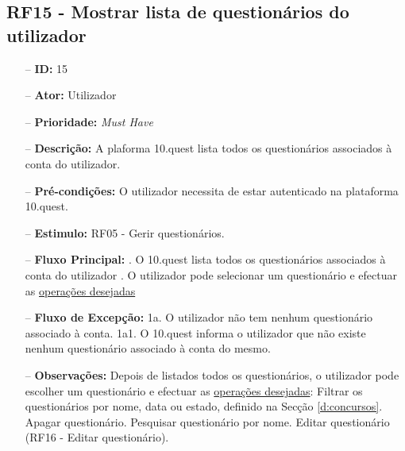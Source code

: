 \subsection{RF15 - Mostrar lista de questionários do utilizador}
\begin{itemize}
	\item[--] \textbf{ID:} 15
	\item[--]  \textbf{Ator:} Utilizador
	\item[--]  \textbf{Prioridade:} \textit{Must Have}
	\item[--]  \textbf{Descrição:} A plaforma 10.quest lista todos os questionários associados à conta do utilizador.
	\item[--]  \textbf{Pré-condições:} O utilizador necessita de estar autenticado na plataforma 10.quest.
	\item[--]  \textbf{Estimulo:} RF05 - Gerir questionários.
	\item[--]  \textbf{Fluxo Principal:} 
		. O 10.quest lista todos os questionários associados à conta do utilizador
		. O utilizador pode selecionar um questionário e efectuar as \underline{operações desejadas}
	\item[--]  \textbf{Fluxo de Excepção:} 
		\subitem 1a. O utilizador não tem nenhum questionário associado à conta.
		\subitem 1a1. O 10.quest informa o utilizador que não existe nenhum questionário associado à conta do mesmo.
	\item[--]  \textbf{Observações:} Depois de listados todos os questionários, o utilizador pode escolher um questionário e efectuar as \underline{operações desejadas}:
		\subitem Filtrar os questionários por nome, data ou estado, definido na Secção \ref{d:concursos}.
		\subitem Apagar questionário.
		\subitem Pesquisar questionário por nome.
		\subitem Editar questionário (RF16 - Editar questionário).
\end{itemize}
\newpage


